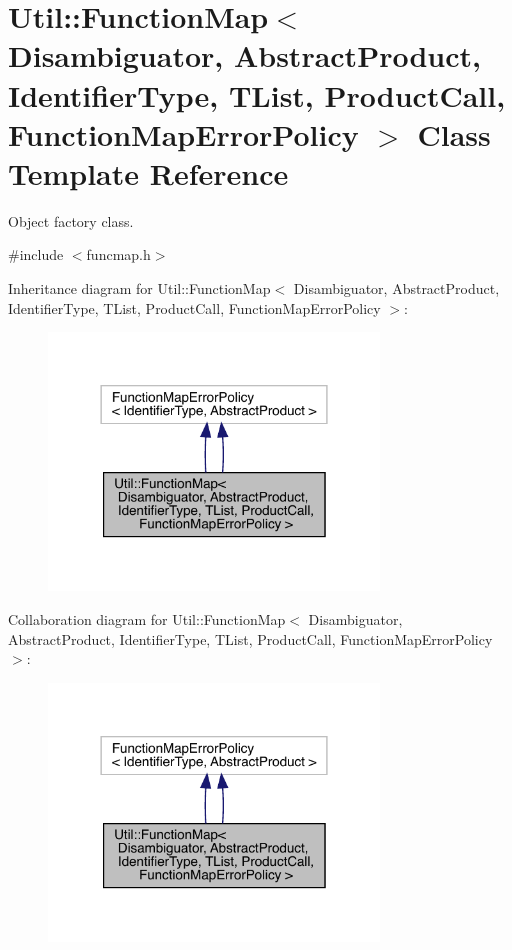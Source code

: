 \hypertarget{classUtil_1_1FunctionMap}{}\section{Util\+:\+:Function\+Map$<$ Disambiguator, Abstract\+Product, Identifier\+Type, T\+List, Product\+Call, Function\+Map\+Error\+Policy $>$ Class Template Reference}
\label{classUtil_1_1FunctionMap}


Object factory class.  




{\ttfamily \#include $<$funcmap.\+h$>$}



Inheritance diagram for Util\+:\+:Function\+Map$<$ Disambiguator, Abstract\+Product, Identifier\+Type, T\+List, Product\+Call, Function\+Map\+Error\+Policy $>$\+:\nopagebreak
\begin{figure}[H]
\begin{center}
\leavevmode
\includegraphics[width=249pt]{dd/d77/classUtil_1_1FunctionMap__inherit__graph}
\end{center}
\end{figure}


Collaboration diagram for Util\+:\+:Function\+Map$<$ Disambiguator, Abstract\+Product, Identifier\+Type, T\+List, Product\+Call, Function\+Map\+Error\+Policy $>$\+:\nopagebreak
\begin{figure}[H]
\begin{center}
\leavevmode
\includegraphics[width=249pt]{de/d10/classUtil_1_1FunctionMap__coll__graph}
\end{center}
\end{figure}
